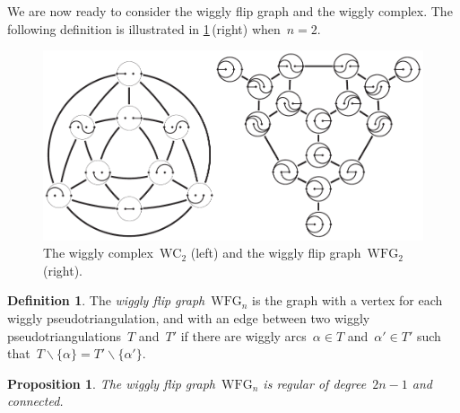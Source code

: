 \documentclass{amsart}
\newtheorem{proposition}[theorem]{Proposition}
\theoremstyle{definition}
\newtheorem{definition}[theorem]{Definition}
\newcommand{\ssm}{\smallsetminus} %
\newcommand{\darkblue}{\color{darkblue}} %
\newcommand{\defn}[1]{\textsl{\darkblue #1}} %
\newcommand{\vincent}[1]{\todo[color=blue!30]{\rm #1 \\ \hfill --- V.}}
\newcommand{\wigglyComplex}{\mathrm{WC}} %
\newcommand{\wigglyFlipGraph}{\mathrm{WFG}} %
\begin{document}

We are now ready to consider the wiggly flip graph and the wiggly complex.
The following definition is illustrated in \cref{fig:wigglyComplex}\,(right) when~$n = 2$.
%
\begin{figure}
\centerline{\includegraphics[scale=1.1]{wigglyComplex}}
\caption{The wiggly complex~$\wigglyComplex_2$ (left) and the wiggly flip graph~$\wigglyFlipGraph_2$ (right).}
\label{fig:wigglyComplex}
\end{figure}

\begin{definition}
\label{def:wigglyFlipGraph}
The \defn{wiggly flip graph}~$\wigglyFlipGraph_n$ is the graph with a vertex for each wiggly pseudotriangulation, and with an edge between two wiggly pseudotriangulations~$T$ and~$T'$ if there are wiggly arcs~$\alpha \in T$ and~$\alpha' \in T'$ such that~$T \ssm \{\alpha\} = T' \ssm \{\alpha'\}$.
\end{definition}

\begin{proposition}
\label{prop:wigglyFlipGraph}
The wiggly flip graph~$\wigglyFlipGraph_n$ is regular of degree~$2n-1$ and connected.
\end{proposition}
\end{document}
